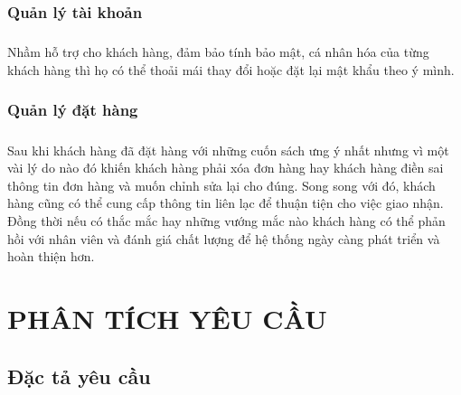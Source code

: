 \documentclass{report}
\begin{document}
\subsection{Quản lý tài khoản}
\paragraph{}
    Nhầm hỗ trợ cho khách hàng, đảm bảo tính bảo mật, cá nhân hóa của từng khách hàng thì họ có thể thoải mái thay đổi hoặc đặt lại mật khẩu theo ý mình.
\subsection{Quản lý đặt hàng}
\paragraph{}
    Sau khi khách hàng đã đặt hàng với những cuốn sách ưng ý nhất nhưng vì một vài lý do nào đó khiến khách hàng phải xóa đơn hàng hay khách hàng điền sai thông tin đơn hàng và muốn chỉnh sửa lại cho đúng. Song song với đó, khách hàng cũng có thể cung cấp thông tin liên lạc để thuận tiện cho việc giao nhận. Đồng thời nếu có thắc mắc hay những vướng mắc nào khách hàng có thể phản hồi với nhân viên và đánh giá chất lượng để hệ thống ngày càng phát triển và hoàn thiện hơn.

\chapter{PHÂN TÍCH YÊU CẦU}
\section{Đặc tả yêu cầu}
\renewcommand\labelitemii{$\circ$}
\end{document}
